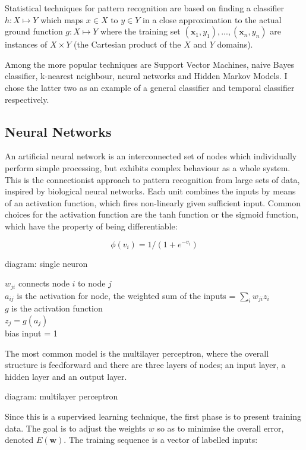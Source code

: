 \documentclass[12pt,a4,notitlepage]{report}
\renewcommand{\_}{\texttt{\symbol{95}}}
\newcommand{\<}{\texttt{\symbol{60}}}
\renewcommand{\>}{\texttt{\symbol{62}}}
\begin{document}
Statistical techniques for pattern recognition are based on finding a classifier
$ h: X \mapsto Y $ which maps $x \in X$ to $y \in Y$ in a close approximation to the actual ground function $ g: X \mapsto Y $ where the training set $ (\mathbf x_1,y_1), ... , (\mathbf x_n, y_n) $ are instances of $X \times Y$ (the Cartesian product of the $X$ and $Y$ domains).

Among the more popular techniques are Support Vector Machines, naive Bayes classifier, k-nearest neighbour, neural networks and Hidden Markov Models. I chose the latter two as an example of a general classifier and temporal classifier respectively.

\subsection{Neural Networks}

An artificial neural network is an interconnected set of nodes which individually perform simple processing, but exhibits complex behaviour as a whole system. This is the connectionist approach to pattern recognition from large sets of data, inspired by  biological neural networks. Each unit combines the inputs by means of an activation function, which fires non-linearly given sufficient input. Common choices for the activation function are the tanh function or the sigmoid function, which have the property of being differentiable:

\[ \phi(v_i) = 1/(1+e^{-v_i}) \]

{diagram: single neuron}

$w_{ji}$ connects node $i$ to node $j$ \\
$a_{ij}$ is the activation for node, the weighted sum of the inputs = $\sum_i {w_{ji}z_i}$ \\
$g$ is the activation function \\
$z_j = g(a_j)$ \\
bias input = 1

The most common model is the multilayer perceptron, where the overall structure is feedforward and there are three layers of nodes; an input layer, a hidden layer and an output layer. 

{diagram: multilayer perceptron}

Since this is a supervised learning technique, the first phase is to present training data. The goal is to adjust the weights $w$ so as to minimise the overall error, denoted ${E}(\mathbf w)$. The training sequence is a vector of labelled inputs:
\end{document}
